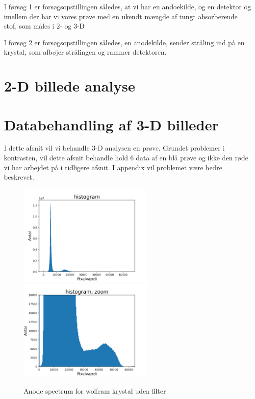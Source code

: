 \documentclass[a4paper,twoside]{article}
\begin{document}
I førsøg 1 er forsøgsopstillingen således, at vi har en andoekilde, og en detektor og imellem der har vi vores prøve med en ukendt mængde af tungt absorberende stof, som måles i 2- og 3-D  

I forsøg 2 er forsøgsopstillingen således, en anodekilde, sender stråling ind på en krystal, som afbøjer strålingen og rammer detektoren.

\section{2-D billede analyse}

\section{Databehandling af 3-D billeder} 
I dette afsnit vil vi behandle 3-D analysen en prøve. Grundet problemer i kontrasten, vil dette afsnit behandle hold 6 data af en blå prøve og ikke den røde vi har arbejdet på i tidligere afsnit. I appendix vil problemet være bedre beskrevet. 

\begin{figure}[H]
\begin{centering}
\includegraphics[height=5cm]{index ikke_xoom.png}
\includegraphics[height=5cm]{index_zoom.png}
\hspace{1cm}
\par\end{centering}
\caption{\label{cap:2ien} Anode spectrum for wolfram krystal uden filter }
\end{figure}
\end{document}
